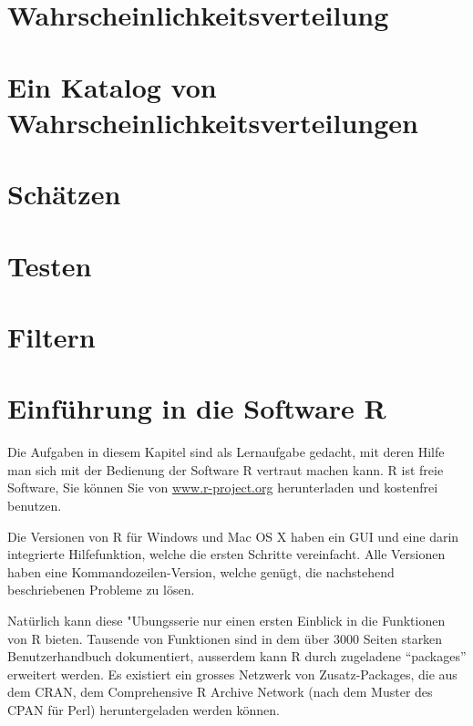 \documentclass[a4paper,12pt]{book}
\begin{document}
\chapter{Wahrscheinlichkeitsverteilung}

\chapter{Ein Katalog von Wahrscheinlichkeitsverteilungen}

\chapter{Schätzen}

\chapter{Testen}

\chapter{Filtern}

\chapter{Einführung in die Software R}
Die Aufgaben in diesem Kapitel sind als Lernaufgabe gedacht, mit deren
Hilfe man sich mit der Bedienung der Software R vertraut machen kann.
R ist freie Software, Sie können Sie von \url{www.r-project.org}
herunterladen und kostenfrei benutzen.

Die Versionen von R für Windows und Mac OS X haben ein GUI und eine darin
integrierte Hilfefunktion, welche die ersten Schritte vereinfacht. Alle
Versionen haben eine Kommandozeilen-Version, welche genügt, die nachstehend
beschriebenen Probleme zu lösen.

Natürlich kann diese "Ubungsserie nur einen ersten Einblick in die
Funktionen von R bieten. Tausende von Funktionen sind in dem über 3000
Seiten starken Benutzerhandbuch dokumentiert, ausserdem kann R durch
zugeladene ``packages'' erweitert werden. Es existiert ein grosses Netzwerk
von Zusatz-Packages, die aus dem CRAN, dem Comprehensive R Archive
Network (nach dem Muster des CPAN für Perl) heruntergeladen werden
können.

\bigskip

\closethemaindex
\printthemata

\end{document}
